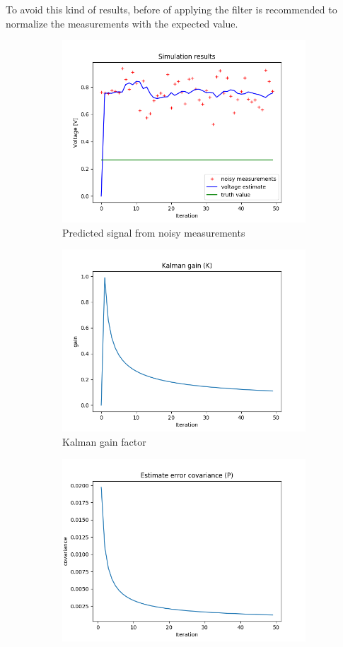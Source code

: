\documentclass{article}
\begin{document}
        To avoid this kind of results, before of applying the filter is recommended to normalize the measurements with the
        expected value.
    
        \begin{figure}
            \begin{subfigure} {.5\textwidth}  
                \centering 
                \includegraphics[width=0.8\linewidth]{./img/nc_.png}
                \caption{Predicted signal from noisy measurements }
            \end{subfigure}
            \begin{subfigure}{.5\textwidth}            
                \centering
                \includegraphics[width=0.8\linewidth]{./img/nc_K.png}
                \caption{Kalman gain factor}
            \end{subfigure}
            \begin{subfigure} {.5\textwidth}  
                \centering 
                \includegraphics[width=0.8\linewidth]{./img/nc_P.png}

\end{subfigure}
\end{figure}
\end{document}
